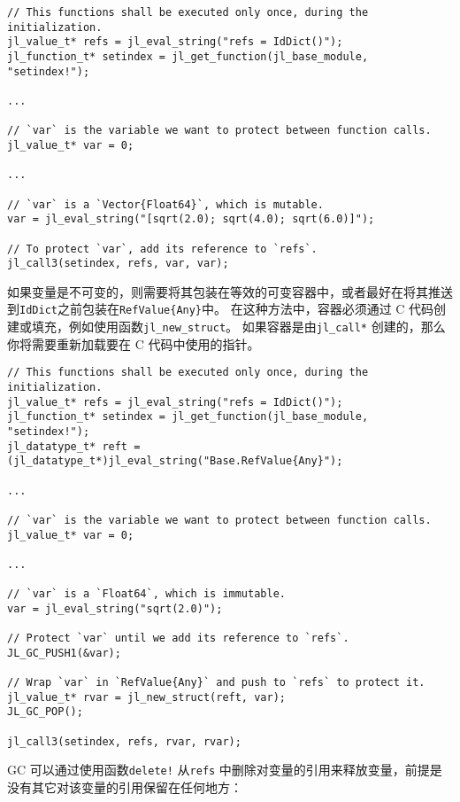 \begin{lstlisting}
// This functions shall be executed only once, during the initialization.
jl_value_t* refs = jl_eval_string("refs = IdDict()");
jl_function_t* setindex = jl_get_function(jl_base_module, "setindex!");

...

// `var` is the variable we want to protect between function calls.
jl_value_t* var = 0;

...

// `var` is a `Vector{Float64}`, which is mutable.
var = jl_eval_string("[sqrt(2.0); sqrt(4.0); sqrt(6.0)]");

// To protect `var`, add its reference to `refs`.
jl_call3(setindex, refs, var, var);
\end{lstlisting}



如果变量是不可变的，则需要将其包装在等效的可变容器中，或者最好在将其推送到\texttt{IdDict}之前包装在\texttt{RefValue\{Any\}}中。 在这种方法中，容器必须通过 C 代码创建或填充，例如使用函数\texttt{jl\_new\_struct}。 如果容器是由\texttt{jl\_call*} 创建的，那么你将需要重新加载要在 C 代码中使用的指针。




\begin{lstlisting}
// This functions shall be executed only once, during the initialization.
jl_value_t* refs = jl_eval_string("refs = IdDict()");
jl_function_t* setindex = jl_get_function(jl_base_module, "setindex!");
jl_datatype_t* reft = (jl_datatype_t*)jl_eval_string("Base.RefValue{Any}");

...

// `var` is the variable we want to protect between function calls.
jl_value_t* var = 0;

...

// `var` is a `Float64`, which is immutable.
var = jl_eval_string("sqrt(2.0)");

// Protect `var` until we add its reference to `refs`.
JL_GC_PUSH1(&var);

// Wrap `var` in `RefValue{Any}` and push to `refs` to protect it.
jl_value_t* rvar = jl_new_struct(reft, var);
JL_GC_POP();

jl_call3(setindex, refs, rvar, rvar);
\end{lstlisting}



GC 可以通过使用函数\texttt{delete!} 从\texttt{refs} 中删除对变量的引用来释放变量，前提是没有其它对该变量的引用保留在任何地方：




